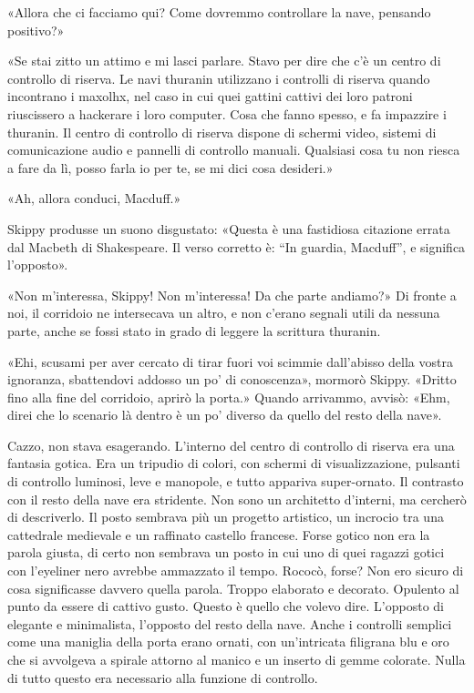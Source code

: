 «Allora che ci facciamo qui? Come dovremmo controllare la nave, pensando
positivo?»

«Se stai zitto un attimo e mi lasci parlare. Stavo per dire che c'è un
centro di controllo di riserva. Le navi thuranin utilizzano i controlli
di riserva quando incontrano i maxolhx, nel caso in cui quei gattini
cattivi dei loro patroni riuscissero a hackerare i loro computer. Cosa
che fanno spesso, e fa impazzire i thuranin. Il centro di controllo di
riserva dispone di schermi video, sistemi di comunicazione audio e
pannelli di controllo manuali. Qualsiasi cosa tu non riesca a fare da
lì, posso farla io per te, se mi dici cosa desideri.»

«Ah, allora conduci, Macduff.»

Skippy produsse un suono disgustato: «Questa è una fastidiosa citazione
errata dal Macbeth di Shakespeare. Il verso corretto è: ``In guardia,
Macduff'', e significa l'opposto».

«Non m'interessa, Skippy! Non m'interessa! Da che parte andiamo?» Di
fronte a noi, il corridoio ne intersecava un altro, e non c'erano
segnali utili da nessuna parte, anche se fossi stato in grado di leggere
la scrittura thuranin.

«Ehi, scusami per aver cercato di tirar fuori voi scimmie dall'abisso
della vostra ignoranza, sbattendovi addosso un po' di conoscenza»,
mormorò Skippy. «Dritto fino alla fine del corridoio, aprirò la porta.»
Quando arrivammo, avvisò: «Ehm, direi che lo scenario là dentro è un po'
diverso da quello del resto della nave».

Cazzo, non stava esagerando. L'interno del centro di controllo di
riserva era una fantasia gotica. Era un tripudio di colori, con schermi
di visualizzazione, pulsanti di controllo luminosi, leve e manopole, e
tutto appariva super-ornato. Il contrasto con il resto della nave era
stridente. Non sono un architetto d'interni, ma cercherò di descriverlo.
Il posto sembrava più un progetto artistico, un incrocio tra una
cattedrale medievale e un raffinato castello francese. Forse gotico non
era la parola giusta, di certo non sembrava un posto in cui uno di quei
ragazzi gotici con l'eyeliner nero avrebbe ammazzato il tempo. Rococò,
forse? Non ero sicuro di cosa significasse davvero quella parola. Troppo
elaborato e decorato. Opulento al punto da essere di cattivo gusto.
Questo è quello che volevo dire. L'opposto di elegante e minimalista,
l'opposto del resto della nave. Anche i controlli semplici come una
maniglia della porta erano ornati, con un'intricata filigrana blu e oro
che si avvolgeva a spirale attorno al manico e un inserto di gemme
colorate. Nulla di tutto questo era necessario alla funzione di
controllo.

